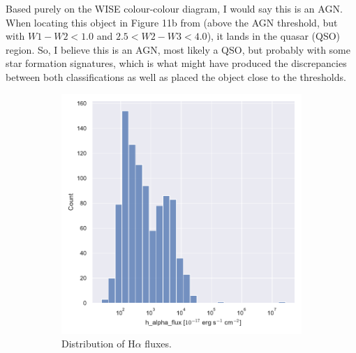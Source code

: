 \documentclass[letterpaper, oneside]{article}
\begin{document}
Based purely on the WISE colour-colour diagram, I would say this is an AGN. When locating this object in Figure 11b from \cite{Jarrett_2017} (above the AGN threshold, but with $W1-W2 < 1.0$ and $2.5 < W2-W3 < 4.0$), it lands in the quasar (QSO) region. So, I believe this is an AGN, most likely a QSO, but probably with some star formation signatures, which is what might have produced the discrepancies between both classifications as well as placed the object close to the thresholds.


\begin{figure}[p]
	\centering
	\begin{subfigure}[b]{0.45\textwidth}
		\centering
		\includegraphics[width=\textwidth]{../distr_h_alpha_flux.pdf}
		\caption[]{Distribution of H$\alpha$ fluxes.}
		\label{fig:distr_h_alpha}
	\end{subfigure}
	\hfill
	\begin{subfigure}[b]{0.45\textwidth} 
		\centering 

\end{subfigure}
\end{figure}
\end{document}
